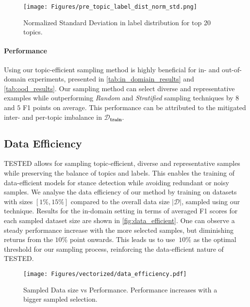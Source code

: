 \documentclass[11pt]{article}
\begin{document}
\begin{figure}[t]
\centering
\texttt{[image: Figures/pre\_topic\_label\_dist\_norm\_std.png]}
\caption{Normalized Standard Deviation in label distribution for top 20 topics.
}
\label{fig:per_topic_dist_std}
\end{figure}

\paragraph{Performance} 

Using our topic-efficient sampling method is highly beneficial for in- and out-of-domain experiments, presented in \autoref{tab:in_domiain_results} and \autoref{tab:ood_results}. Our sampling method can select diverse and representative examples while outperforming \textit{Random} and \textit{Stratified} sampling techniques by $8$ and $5$ F1 points on average. This performance can be attributed to the mitigated inter- and per-topic imbalance in $\mathcal{D}_\textbf{train}$.


\subsection{Data Efficiency}
\label{subsec:data_efficiency}

TESTED allows for sampling topic-efficient, diverse and representative samples while preserving the balance of topics and labels. This enables the training of data-efficient models for stance detection while avoiding redundant or noisy samples. We analyse the data efficiency of our method by training on datasets with sizes $[1\%,15\%]$ compared to the overall data size $\lvert \mathcal{D}\rvert$, sampled using our technique. Results for the in-domain setting in terms of averaged F1 scores for each sampled dataset size are shown in \autoref{fig:data_efficient}. One can observe a steady performance increase with the more selected samples, but diminishing returns from the $10\%$ point onwards. This leads us to use $~10\%$ as the optimal threshold for our sampling process, reinforcing the data-efficient nature of TESTED.

\begin{figure}[t]
\centering
\texttt{[image: Figures/vectorized/data\_efficiency.pdf]}
\caption{Sampled Data size vs Performance. Performance increases with a bigger sampled selection.}
\label{fig:data_efficient}
\end{figure}
\end{document}
